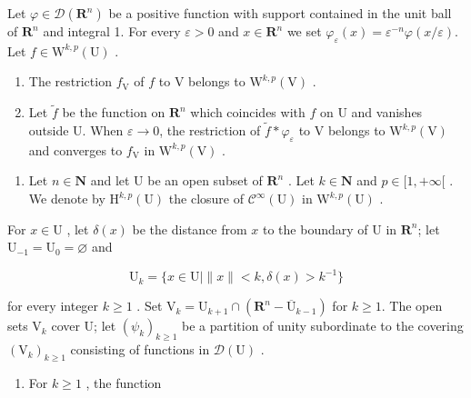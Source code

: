 Let \(\varphi \in \mathcal{D}(\mathbf{R}^n)\) be a positive function with support contained in the unit ball of \(\mathbf{R}^n\) and integral 1. For every \(\varepsilon > 0\) and \(x \in \mathbf{R}^n\) we set \(\varphi_{\varepsilon}(x) = \varepsilon^{-n}\varphi(x/\varepsilon)\). Let \(f \in \mathrm{W}^{k,p}(\mathrm{U})\) .

\begin{enumerate}
\def\labelenumi{\alph{enumi})}
\item
  The restriction \(f_{\mathrm{V}}\) of \(f\) to V belongs to \(\mathrm{W}^{k,p}(\mathrm{V})\) .
\item
  Let \(\widetilde{f}\) be the function on \(\mathbf{R}^n\) which coincides with \(f\) on U and vanishes outside U. When \(\varepsilon \to 0\), the restriction of \(\widetilde{f} * \varphi_{\varepsilon}\) to V belongs to \(\mathrm{W}^{k,p}(\mathrm{V})\) and converges to \(f_{\mathrm{V}}\) in \(\mathrm{W}^{k,p}(\mathrm{V})\) .
\end{enumerate}

\begin{enumerate}
\def\labelenumi{\arabic{enumi})}
\setcounter{enumi}{10}
\tightlist
\item
  Let \(n \in \mathbf{N}\) and let U be an open subset of \(\mathbf{R}^n\) . Let \(k \in \mathbf{N}\) and \(p \in [1, +\infty[\) . We denote by \(\mathrm{H}^{k,p}(\mathrm{U})\) the closure of \(\mathcal{C}^{\infty}(\mathrm{U})\) in \(\mathrm{W}^{k,p}(\mathrm{U})\) .
\end{enumerate}

For \(x \in \mathrm{U}\) , let \(\delta(x)\) be the distance from \(x\) to the boundary of \(\mathrm{U}\) in \(\mathbf{R}^n\); let \(\mathrm{U}_{-1} = \mathrm{U}_0 = \varnothing\) and

\[
\mathrm{U} _ {k} = \{x \in \mathrm{U} | \| x \| <   k, \delta (x) > k ^ {- 1} \}
\]

for every integer \(k \geqslant 1\) . Set \(\mathrm{V}_k = \mathrm{U}_{k+1} \cap (\mathbf{R}^n - \overline{\mathrm{U}}_{k-1})\) for \(k \geqslant 1\). The open sets \(\mathrm{V}_k\) cover U; let \((\psi_k)_{k \geqslant 1}\) be a partition of unity subordinate to the covering \((\mathrm{V}_k)_{k \geqslant 1}\) consisting of functions in \(\mathcal{D}(\mathrm{U})\) .

\begin{enumerate}
\def\labelenumi{\alph{enumi})}
\tightlist
\item
  For \(k \geqslant 1\) , the function
\end{enumerate}

